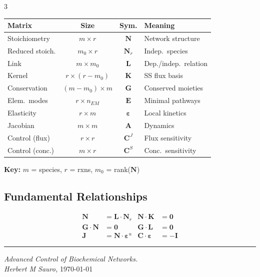 \documentclass[10pt,landscape,letter]{article}
\begin{document}
\begin{multicols}{3}
\begin{center}
\footnotesize
\begin{tabular}{lccp{2.2cm}}
\toprule
\textbf{Matrix} & \textbf{Size} & \textbf{Sym.} & \textbf{Meaning} \\
\midrule
Stoichiometry & $m \times r$ & $\mathbf{N}$ & Network structure \\
Reduced stoich. & $m_0 \times r$ & $\mathbf{N}_r$ & Indep.\ species \\
Link & $m \times m_0$ & $\mathbf{L}$ & Dep./indep.\ relation \\
Kernel & $r \times (r{-}m_0)$ & $\mathbf{K}$ & SS flux basis \\
Conservation & $(m{-}m_0) \times m$ & $\mathbf{G}$ & Conserved moieties \\
Elem.\ modes & $r \times n_{EM}$ & $\mathbf{E}$ & Minimal pathways \\
Elasticity & $r \times m$ & $\boldsymbol{\varepsilon}$ & Local kinetics \\
Jacobian & $m \times m$ & $\mathbf{A}$ & Dynamics \\
Control (flux) & $r \times r$ & $\mathbf{C}^J$ & Flux sensitivity \\
Control (conc.) & $m \times r$ & $\mathbf{C}^S$ & Conc.\ sensitivity \\
\bottomrule
\end{tabular}
\end{center}

\textbf{Key:} $m$ = species, $r$ = rxns, $m_0$ = rank($\mathbf{N}$)

\subsection{Fundamental Relationships}
\begin{align*}
\mathbf{N} &= \mathbf{L} \cdot \mathbf{N}_r & \mathbf{N} \cdot \mathbf{K} &= \mathbf{0} \\
\mathbf{G} \cdot \mathbf{N} &= \mathbf{0} & \mathbf{G} \cdot \mathbf{L} &= \mathbf{0} \\
\mathbf{J} &= \mathbf{N} \cdot \boldsymbol{\varepsilon}^u & \mathbf{C} \cdot \boldsymbol{\varepsilon} &= -\mathbf{I}
\end{align*}

\vfill
\hrule
\vspace{3pt}
\footnotesize
\textit{Advanced Control of Biochemical Networks.\\ Herbert M Sauro,} \today 

\end{multicols}
\end{document}
